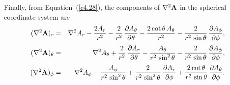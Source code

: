Finally, from Equation~(\ref{c4.28}), the components of $\nabla^2{\bf A}$ in the
spherical coordinate system are
\begin{eqnarray}
(\nabla^2{\bf A})_r &=&\nabla^2 A_r  -\frac{2 A_r}{r^2}-\frac{2}{r^2}\,\frac{\partial A_\theta}{\partial\theta}-\frac{2\cot\theta\, A_\theta}{r^2} -\frac{2}{r^2\,\sin\theta}\,\frac{\partial A_\phi}{\partial\phi},\\[0.5ex]
(\nabla^2{\bf A})_\theta &=& \nabla^2 A_\theta +\frac{2}{r^2}\,\frac{\partial A_r}{\partial\theta}-\frac{A_\theta}{r^2\,\sin^2\theta}
-\frac{2}{r^2\,\sin\theta}\,\frac{\partial A_\phi}{\partial\phi},\\[0.5ex]
(\nabla^2{\bf A})_\phi &=&\nabla^2 A_\phi-\frac{A_\phi}{r^2\,\sin^2\theta} + \frac{2}{r^2\,\sin^2\theta}\,\frac{\partial A_r}{\partial\phi}+\frac{2 \cot\theta}{r^2\,\sin\theta}\,\frac{\partial A_\theta}{\partial\phi}.
\end{eqnarray}

